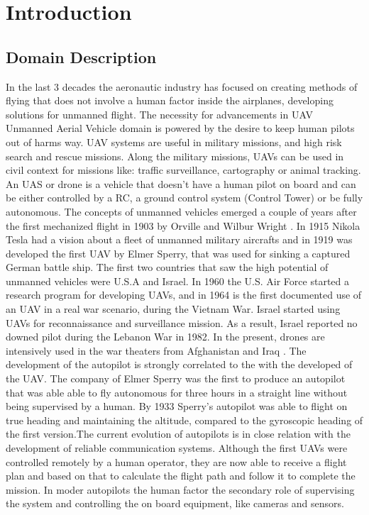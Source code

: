 \chapter{Introduction}
\label{chapter:intro}

\section{Domain Description}
\label{sec:domain}
In the last 3 decades the aeronautic industry has focused on creating methods 
of flying that does not involve a human factor inside the airplanes, developing
solutions for unmanned flight. The necessity for advancements in UAV
{Unmanned Aerial Vehicle} domain is powered by the desire to keep human pilots 
out of harms way. UAV systems are useful in military missions, and high risk 
search and rescue missions. Along the military missions, UAVs can be used in 
civil context for missions like: traffic surveillance, cartography or animal 
tracking. An UAS or drone is a vehicle that doesn't have
a human pilot on board and can be either controlled by a RC, 
a ground control system (Control Tower) or be fully autonomous. The concepts of 
unmanned vehicles emerged a couple of years after the first mechanized flight
in 1903 by Orville and Wilbur Wright \cite{learning-to-fly}. In 1915 Nikola
Tesla had a vision about a fleet of unmanned military aircrafts and in 1919 was
developed the first UAV by Elmer Sperry,  that was used for sinking a captured
German battle ship. The first two countries that saw the high potential of unmanned vehicles were
U.S.A and Israel. In 1960 the U.S. Air Force started a research program for
developing UAVs,  and in 1964 is the first documented use of an UAV in a real
war scenario,  during the Vietnam War. Israel started using UAVs for 
reconnaissance and surveillance mission. As a result, Israel reported no downed 
pilot during the Lebanon War in 1982. In the present,  drones are intensively 
used in the war theaters from Afghanistan and Iraq \cite{eyes-of-the-army}.
The development of the autopilot is strongly correlated to the with the 
developed of the UAV. The company of Elmer Sperry was the first to produce
an autopilot that was able able to fly autonomous for three hours in a straight
line without being supervised by a human. By 1933 Sperry's autopilot was able to
flight on true heading and maintaining the altitude,  compared to the gyroscopic
heading of the first version.The current evolution of autopilots is in close relation with the development
of reliable communication systems. Although the first UAVs were controlled
remotely by a human operator,  they are now able to receive a flight plan
and based on that to calculate the flight path and follow it to complete the 
mission. In moder autopilots the human factor the secondary role of supervising
the system and controlling the on board equipment, like cameras and sensors. 

